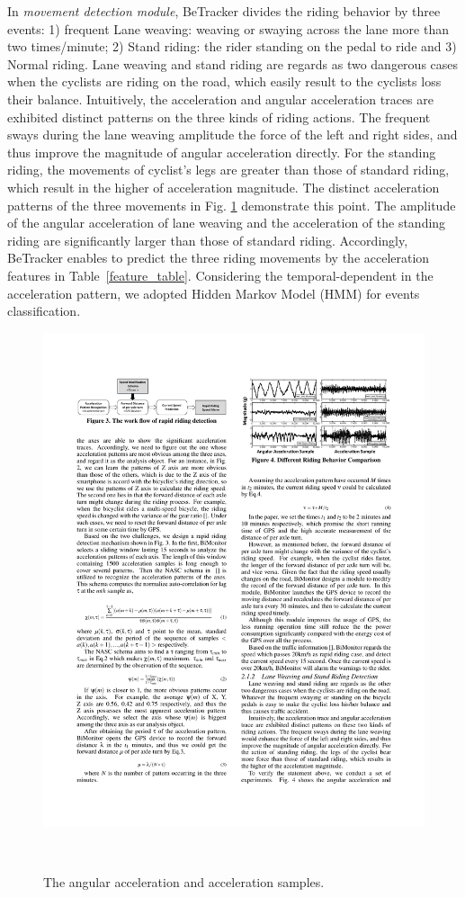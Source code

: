 \documentclass{sigchi-ext}
\def\sysname{BeTracker }
\begin{document}
In \textit{movement detection module}, \sysname divides the riding behavior by three events: 1) frequent Lane weaving: weaving or swaying across the lane more than two times/minute;  2) Stand riding: the rider standing on the pedal to ride and 3) Normal riding. 
Lane weaving and stand riding are regards as two dangerous cases when the cyclists are riding on the road, which easily result to the cyclists loss their balance.
Intuitively, the acceleration and angular acceleration traces are exhibited distinct patterns on the three kinds of riding actions. The frequent sways during the lane weaving amplitude the force of the left and right sides, and thus improve the magnitude of angular acceleration directly. For the standing riding, the movements of cyclist's legs are greater than those of standard riding, which result in the higher of acceleration magnitude.
The distinct acceleration patterns of the three movements in Fig. \ref{fig:acc} demonstrate this point. The amplitude of the angular acceleration of lane weaving and the acceleration of the standing riding  are significantly larger than those of standard riding.  Accordingly, \sysname enables to predict the three riding movements by the acceleration features in Table~\ref{feature_table}. Considering the temporal-dependent in the acceleration pattern, we adopted Hidden Markov Model (HMM) for events classification.
\begin{figure}[h]
	\includegraphics[width=0.9\columnwidth]{figures/acc.pdf}
	\caption{The angular acceleration and acceleration samples.}~\label{fig:acc}
\end{figure}
\end{document}

